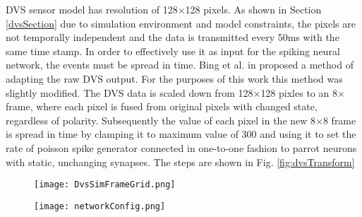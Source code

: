 DVS sensor model has resolution of 128\(\times\)128 pixels. As shown in Section \ref{dvsSection} due to simulation environment and model constraints, the pixels are not temporally independent and the data is transmitted every 50ms with the same time stamp. In order to effectively use it as input for the spiking neural network, the events must be spread in time. Bing et al. in \cite{8} proposed a method of adapting the raw DVS output. For the purposes of this work this method was slightly modified. The DVS data is scaled down from 128\(\times\)128 pixles to an 8\(\times\) frame, where each pixel is fused from original pixels with changed state, regardless of polarity. Subsequently the value of each pixel in the new 8\(\times\)8 frame is spread in time by clamping it to maximum value of 300 and using it to set the rate of poisson spike generator connected in one-to-one fashion to parrot neurons with static, unchanging synapses. The steps are shown in Fig. \ref{fig:dvsTransform}

\begin{figure*}[t!]
	\captionsetup{justification=centering}
	\centering
	\begin{subfigure}[t]{0.5\textwidth}
		\centering
		\texttt{[image: DvsSimFrameGrid.png]} 
		\caption{}
	\end{subfigure}
	\begin{subfigure}[t]{0.3\textwidth}
		\texttt{[image: networkConfig.png]}
		\caption{}
	\end{subfigure}
	\caption{Scaling of original DVS frame to 8\(\times\)8 frame \\(a) - original simulated frame, (b) - fused 8\(\times\)8 frame \label{fig:dvsTransform}}  
\end{figure*}



